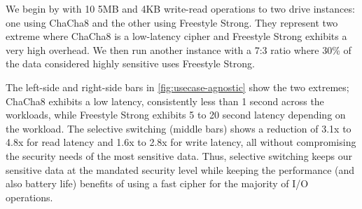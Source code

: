 We begin by with 10 5MB and 4KB write-read operations to two \sys drive
instances: one using ChaCha8 and the other using Freestyle Strong. They
represent two extreme where ChaCha8 is a low-latency cipher and Freestyle Strong
exhibits a very high overhead. We then run another \sys instance with a 7:3
ratio where 30\% of the data considered highly sensitive uses Freestyle Strong.



The left-side and right-side bars in \cref{fig:usecase-agnostic} show the two
extremes; ChaCha8 exhibits a low latency, consistently less than 1 second across
the workloads, while Freestyle Strong exhibits 5 to 20 second latency depending
on the workload. The selective switching (middle bars) shows a reduction of 3.1x
to 4.8x for read latency and 1.6x to 2.8x for write latency, all without
compromising the security needs of the most sensitive data. Thus, selective
switching keeps our sensitive data at the mandated security level while keeping
the performance (and also battery life) benefits of using a fast cipher for the
majority of I/O operations.
